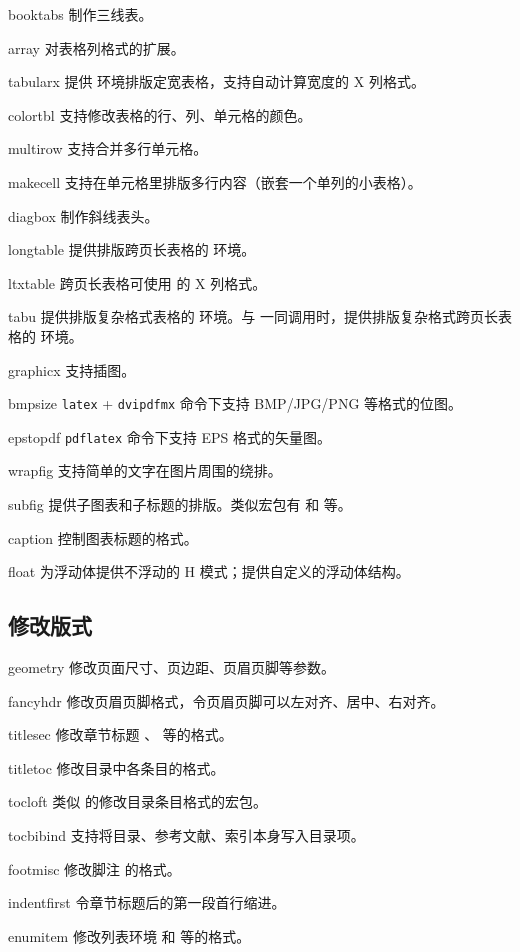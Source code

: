 \begin{pkglist}
  \item[booktabs]  制作三线表。
  \item[array]    对表格列格式的扩展。
  \item[tabularx] 提供  环境排版定宽表格，支持自动计算宽度的 X 列格式。
  \item[colortbl] 支持修改表格的行、列、单元格的颜色。
  \item[multirow] 支持合并多行单元格。
  \item[makecell] 支持在单元格里排版多行内容（嵌套一个单列的小表格）。
  \item[diagbox]  制作斜线表头。
  \item[longtable] 提供排版跨页长表格的  环境。
  \item[ltxtable] 跨页长表格可使用  的 X 列格式。
  \item[tabu]     提供排版复杂格式表格的  环境。与  一同调用时，提供排版复杂格式跨页长表格的  环境。
  \item[graphicx] 支持插图。
  \item[bmpsize]  \texttt{latex} + \texttt{dvipdfmx} 命令下支持 BMP/JPG/PNG 等格式的位图。
  \item[epstopdf] \texttt{pdflatex} 命令下支持 EPS 格式的矢量图。
  \item[wrapfig]  支持简单的文字在图片周围的绕排。
  \item[subfig]   提供子图表和子标题的排版。类似宏包有  和  等。
  \item[caption]  控制图表标题的格式。
  \item[float]    为浮动体提供不浮动的 H 模式；提供自定义的浮动体结构。
\end{pkglist}

\subsection{修改版式}\label{subsec:pkg-layout}

\begin{pkglist}
  \item[geometry] 修改页面尺寸、页边距、页眉页脚等参数。
  \item[fancyhdr] 修改页眉页脚格式，令页眉页脚可以左对齐、居中、右对齐。
  \item[titlesec] 修改章节标题 、 等的格式。
  \item[titletoc] 修改目录中各条目的格式。
  \item[tocloft]  类似  的修改目录条目格式的宏包。
  \item[tocbibind] 支持将目录、参考文献、索引本身写入目录项。
  \item[footmisc] 修改脚注  的格式。
  \item[indentfirst] 令章节标题后的第一段首行缩进。
  \item[enumitem] 修改列表环境  和  等的格式。
\end{pkglist}

\endinput